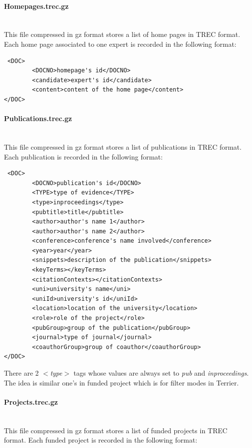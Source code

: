 \paragraph{Homepages.trec.gz} \hspace{0pt} \\
This file compressed in gz format stores a list of home pages in TREC format. Each home page associated to one expert is recorded in the following format:
\begin{verbatim}
 <DOC>
        <DOCNO>homepage's id</DOCNO>
        <candidate>expert's id</candidate>
        <content>content of the home page</content>
</DOC>
\end{verbatim}

\paragraph{Publications.trec.gz} \hspace{0pt} \\
This file compressed in gz format stores a list of publications in TREC format. Each publication is recorded in the following format:
\begin{verbatim}
 <DOC>
        <DOCNO>publication's id</DOCNO>
        <TYPE>type of evidence</TYPE>
        <type>inproceedings</type>
        <pubtitle>title</pubtitle>
        <author>author's name 1</author>
        <author>author's name 2</author>
        <conference>conference's name involved</conference>
        <year>year</year>
        <snippets>description of the publication</snippets>
        <keyTerms></keyTerms>
        <citationContexts></citationContexts>
        <uni>university's name</uni>
        <uniId>university's id</uniId>
        <location>location of the university</location>
        <role>role of the project</role>
        <pubGroup>group of the publication</pubGroup>
        <journal>type of journal</journal>
        <coauthorGroup>group of coauthor</coauthorGroup>
</DOC>
\end{verbatim}
There are 2 \textit{$<$type$>$} tags whose values are always set to \textit{pub} and \textit{inproceedings}. The idea is similar one's in 
funded project which is for filter modes in Terrier.

\paragraph{Projects.trec.gz} \hspace{0pt} \\
This file compressed in gz format stores a list of funded projects in TREC format. Each funded project is recorded in the following format:

